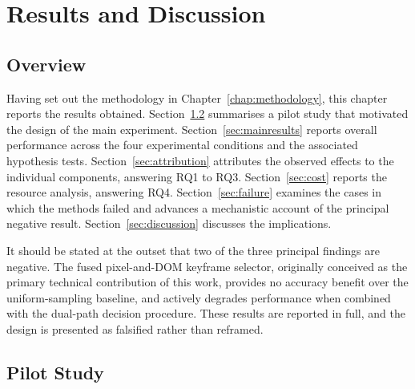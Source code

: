 %
%

\chapter{Results and Discussion}
\label{chap:results_and_discussion}


\section{Overview}
\label{sec:r-overview}

Having set out the methodology in Chapter~\ref{chap:methodology}, this
chapter reports the results obtained. Section~\ref{sec:pilot} summarises a
pilot study that motivated the design of the main experiment.
Section~\ref{sec:mainresults} reports overall performance across the four
experimental conditions and the associated hypothesis tests.
Section~\ref{sec:attribution} attributes the observed effects to the
individual components, answering RQ1 to RQ3.
Section~\ref{sec:cost} reports the resource analysis, answering RQ4.
Section~\ref{sec:failure} examines the cases in which the methods failed
and advances a mechanistic account of the principal negative result.
Section~\ref{sec:discussion} discusses the implications.

It should be stated at the outset that two of the three principal findings
are negative. The fused pixel-and-DOM keyframe selector, originally
conceived as the primary technical contribution of this work, provides no
accuracy benefit over the uniform-sampling baseline, and actively degrades
performance when combined with the dual-path decision procedure. These
results are reported in full, and the design is presented as falsified
rather than reframed.


\section{Pilot Study}
\label{sec:pilot}

